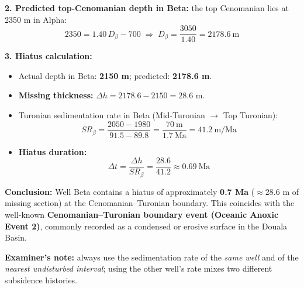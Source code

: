 \documentclass[11pt]{article}
\begin{document}
\begin{exoresolu}
\textbf{2. Predicted top-Cenomanian depth in Beta:} the top Cenomanian lies at 2350 m in Alpha:
\[ 2350 = 1.40\,D_{\beta} - 700 \;\Rightarrow\; D_{\beta} = \frac{3050}{1.40} = 2178.6\ \mathrm{m} \]

\textbf{3. Hiatus calculation:}
\begin{itemize}
    \item Actual depth in Beta: \textbf{2150 m}; predicted: \textbf{2178.6 m}.
    \item \textbf{Missing thickness:} $\Delta h = 2178.6 - 2150 = 28.6$ m.
    \item Turonian sedimentation rate in Beta (Mid-Turonian $\rightarrow$ Top Turonian):
    \[ SR_{\beta} = \frac{2050 - 1980}{91.5 - 89.8} = \frac{70\ \mathrm{m}}{1.7\ \mathrm{Ma}} = 41.2\ \mathrm{m/Ma} \]
    \item \textbf{Hiatus duration:}
    \[ \Delta t = \frac{\Delta h}{SR_{\beta}} = \frac{28.6}{41.2} \approx 0.69\ \mathrm{Ma} \]
\end{itemize}

\textbf{Conclusion:} Well Beta contains a hiatus of approximately \textbf{0.7 Ma} ($\approx 28.6$ m of missing section) at the Cenomanian--Turonian boundary. This coincides with the well-known \textbf{Cenomanian--Turonian boundary event (Oceanic Anoxic Event 2)}, commonly recorded as a condensed or erosive surface in the Douala Basin.

\textbf{Examiner's note:} always use the sedimentation rate of the \emph{same well} and of the \emph{nearest undisturbed interval}; using the other well's rate mixes two different subsidence histories.
\end{exoresolu}
\end{document}
